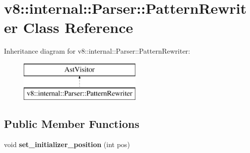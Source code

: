 \hypertarget{classv8_1_1internal_1_1_parser_1_1_pattern_rewriter}{}\section{v8\+:\+:internal\+:\+:Parser\+:\+:Pattern\+Rewriter Class Reference}
\label{classv8_1_1internal_1_1_parser_1_1_pattern_rewriter}
Inheritance diagram for v8\+:\+:internal\+:\+:Parser\+:\+:Pattern\+Rewriter\+:\begin{figure}[H]
\begin{center}
\leavevmode
\includegraphics[height=2.000000cm]{classv8_1_1internal_1_1_parser_1_1_pattern_rewriter}
\end{center}
\end{figure}
\subsection*{Public Member Functions}
\begin{DoxyCompactItemize}
\item 
void {\bfseries set\+\_\+initializer\+\_\+position} (int pos)\hypertarget{classv8_1_1internal_1_1_parser_1_1_pattern_rewriter_a62b897a54eb88e2e89a79b871e991e40}{}\label{classv8_1_1internal_1_1_parser_1_1_pattern_rewriter_a62b897a54eb88e2e89a79b871e991e40}

\end{DoxyCompactItemize}
